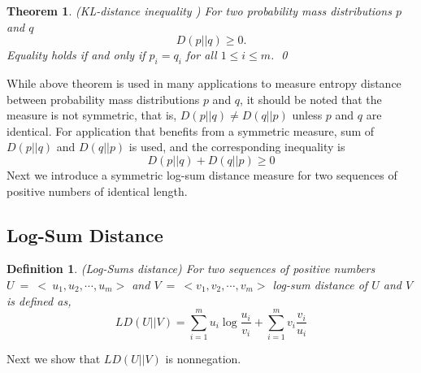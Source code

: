 \documentclass[10pt,myheadings]{IEEEtran}
\newtheorem{definition}{Definition}
\newtheorem{theorem}{Theorem}
\begin{document}
	\begin{theorem}
	\label{KL-dist-inequality}
	(\emph{KL-distance inequality \cite{Cover2006}}) For two probability mass distributions $p$ and $q$
	\begin{equation}
	D(p||q) \geq 0.
	\label{eq:KL-distInequality}
	\end{equation}
	Equality holds if and only if $p_i = q_i$ for all $1 \leq i \leq m$. \qed
\end{theorem}

While above theorem is used in many applications to measure entropy distance between probability mass distributions $p$ and $q$, it should be noted that the measure is not symmetric, that is, $D(p||q) \neq D(q||p)$ unless $p$ and $q$ are identical. 
For application that benefits from a symmetric measure, sum of $D(p||q)$ and $D(q||p)$ is used, and the corresponding inequality is
\begin{equation}
D(p||q) + D(q||p) \geq 0
\label{eq:SymmetricKLdist}
\end{equation}
	Next we introduce a symmetric log-sum distance measure for two sequences of positive numbers of identical length.
	
\subsection{Log-Sum Distance}
\label{sec:LogSumKLDiv}

	\begin{definition} (\emph{Log-Sums distance})
	For two sequences of positive numbers $U~=~<~u_1,u_2,\cdots,u_m>$ and $V~=~<v_1,v_2,\cdots,v_m> $ log-sum distance of $U$ and $V$ is defined as,
	\begin{equation}
	LD(U||V) = \sum_{i=1}^m u_i\log\frac{u_i}{v_i} + \sum_{i=1}^m v_i\frac{v_i}{u_i}
	\label{eq:LogSumDist}
	\end{equation}	
	\end{definition}
	\par
	Next we show that $LD(U||V)$ is nonnegation.
	
\end{document}
